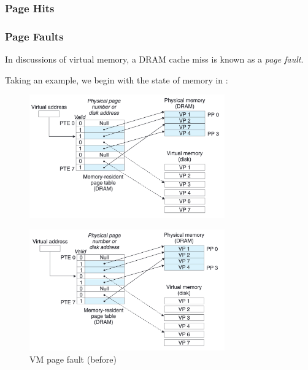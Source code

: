 \documentclass[../main.tex]{subfiles}
\begin{document}
\subsubsection*{Page Hits}



\subsubsection*{Page Faults}

In discussions of virtual memory, a DRAM cache miss is known as a \textit{page fault}. 

Taking an example, we begin with the state of memory in :

\begin{figure}[H]
    \centering
    \includegraphics[width=0.75\textwidth]{graphics/Figure 4.5.png}
    \caption{}
    \label{fig:45}
\end{figure}



\begin{figure}[H]
    \centering
    \includegraphics[width=0.75\textwidth]{graphics/Figure 4.6.png}
    \caption{VM page fault (before)}
    \label{fig:46}
\end{figure}
\end{document}

